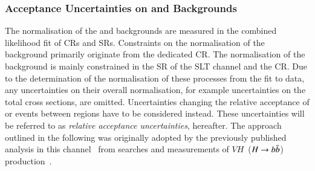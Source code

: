 \subsubsection{Acceptance Uncertainties on \ZHF and \ttbar Backgrounds}

The normalisation of the \ZHF and \ttbar backgrounds are measured in the
combined likelihood fit of CRs and SRs. Constraints on the normalisation of the
\ZHF background primarily originate from the dedicated CR. The normalisation of
the \ttbar background is mainly constrained in the SR of the \lephad SLT channel
and the \ZHF CR. Due to the determination of the normalisation of these
processes from the fit to data, any uncertainties on their overall
normalisation, for example uncertainties on the total cross sections, are
omitted. Uncertainties changing the relative acceptance of \ZHF or \ttbar events
between regions have to be considered instead. These uncertainties will be
referred to as \emph{relative acceptance uncertainties}, hereafter. The approach
outlined in the following was originally adopted by the previously published
analysis in this channel~\cite{HIGG-2016-16-witherratum} from searches and
measurements of $VH$~($H\to b\bar{b}$)
production~\cite{HIGG-2016-29,HIGG-2018-04,HIGG-2018-51}.

